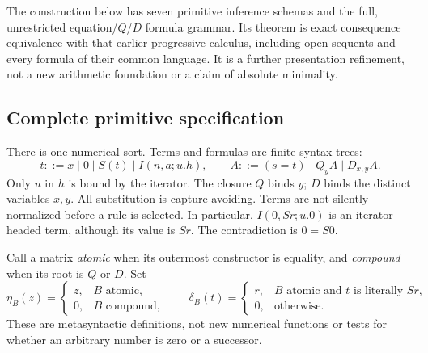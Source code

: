 \documentclass[11pt,a4paper]{article}
\theoremstyle{definition}\newtheorem{definition}[theorem]{Definition}
\begin{document}
The construction below has seven primitive inference schemas and the full,
unrestricted equation/$Q$/$D$ formula grammar.  Its theorem is exact
consequence equivalence with that earlier progressive calculus, including
open sequents and every formula of their common language.  It is a further
presentation refinement, not a new arithmetic foundation or a claim of
absolute minimality.

\subsection{Complete primitive specification}
\label{target:specification}

There is one numerical sort.  Terms and formulas are finite syntax trees:
\[
 t ::= x\mid 0\mid S(t)\mid I(n,a;u.h),
 \qquad
 A ::= (s=t)\mid Q_y A\mid D_{x,y}A.
\]
Only $u$ in $h$ is bound by the iterator.  The closure $Q$ binds $y$; $D$
binds the distinct variables $x,y$.  All substitution is capture-avoiding.
Terms are not silently normalized before a rule is selected.  In particular,
$I(0,Sr;u.0)$ is an iterator-headed term, although its value is $Sr$.
The contradiction is $0=S0$.

Call a matrix \emph{atomic} when its outermost constructor is equality,
and \emph{compound} when its root is $Q$ or $D$.  Set
\[
 \eta_B(z)=
 \begin{cases}
 z,&B\text{ atomic},\\
 0,&B\text{ compound},
 \end{cases}
 \qquad
 \delta_B(t)=
 \begin{cases}
 r,&B\text{ atomic and }t\text{ is literally }Sr,\\
 0,&\text{otherwise}.
 \end{cases}
 \tag{Target dispatch}\label{target:dispatch}
\]
These are metasyntactic definitions, not new numerical functions or tests
for whether an arbitrary number is zero or a successor.
\end{document}
